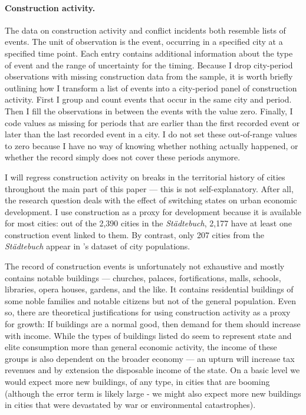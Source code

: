 \documentclass[11pt, a4paper]{article}
\begin{document}
\paragraph{Construction activity.}

The data on construction activity \citep{pt5} and conflict incidents \citep{pt6} both resemble lists of events. The unit of observation is the event, occurring in a specified city at a specified time point. Each entry contains additional information about the type of event and the range of uncertainty for the timing. Because I drop city-period observations with missing construction data from the sample, it is worth briefly outlining how I transform a list of events into a city-period panel of construction activity. First I group and count events that occur in the same city and period. Then I fill the observations in between the events with the value zero. Finally, I code values as missing for periods that are earlier than the first recorded event or later than the last recorded event in a city. I do not set these out-of-range values to zero because I have no way of knowing whether nothing actually happened, or whether the record simply does not cover these periods anymore.

I will regress construction activity on breaks in the territorial history of cities throughout the main part of this paper --- this is not self-explanatory. After all, the research question deals with the effect of switching states on urban economic development. I use construction as a proxy for development because it is available for most cities: out of the 2,390 cities in the \textit{Städtebuch}, 2,177 have at least one construction event linked to them. By contrast, only 207 cities from the \textit{Städtebuch} appear in \cite{bairoch1988}'s dataset of city populations.

The record of construction events is unfortunately not exhaustive and mostly contains notable buildings --- churches, palaces, fortifications, malls, schools, libraries, opera houses, gardens, and the like. It contains residential buildings of some noble families and notable citizens but not of the general population. Even so, there are theoretical justifications for using construction activity as a proxy for growth: If buildings are a normal good, then demand for them should increase with income. While the types of buildings listed do seem to represent state and elite consumption more than general economic activity, the income of these groups is also dependent on the broader economy --- an upturn will increase tax revenues and by extension the disposable income of the state. On a basic level we would expect more new buildings, of any type, in cities that are booming (although the error term is likely large - we might also expect more new buildings in cities that were devastated by war or environmental catastrophes).
\end{document}

